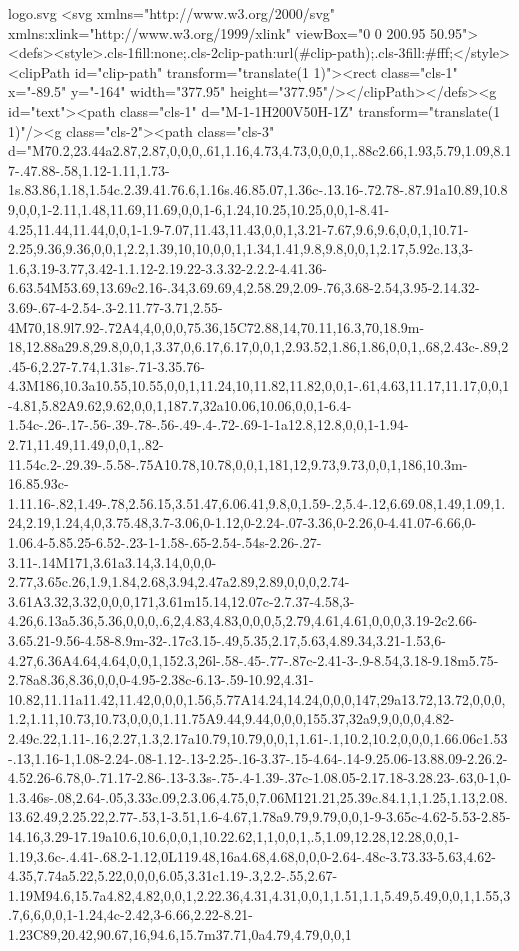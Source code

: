 	\begin{filecontents*}[overwrite]{logo.svg}
	<svg xmlns="http://www.w3.org/2000/svg" xmlns:xlink="http://www.w3.org/1999/xlink" viewBox="0 0 200.95 50.95"><defs><style>.cls-1{fill:none;}.cls-2{clip-path:url(#clip-path);}.cls-3{fill:#fff;}</style><clipPath id="clip-path" transform="translate(1 1)"><rect class="cls-1" x="-89.5" y="-164" width="377.95" height="377.95"/></clipPath></defs><g id="text"><path class="cls-1" d="M-1-1H200V50H-1Z" transform="translate(1 1)"/><g class="cls-2"><path class="cls-3" d="M70.2,23.44a2.87,2.87,0,0,0,.61,1.16,4.73,4.73,0,0,0,1,.88c2.66,1.93,5.79,1.09,8.17-.47.88-.58,1.12-1.11,1.73-1s.83.86,1.18,1.54c.2.39.41.76.6,1.16s.46.85.07,1.36c-.13.16-.72.78-.87.91a10.89,10.89,0,0,1-2.11,1.48,11.69,11.69,0,0,1-6,1.24,10.25,10.25,0,0,1-8.41-4.25,11.44,11.44,0,0,1-1.9-7.07,11.43,11.43,0,0,1,3.21-7.67,9.6,9.6,0,0,1,10.71-2.25,9.36,9.36,0,0,1,2.2,1.39,10,10,0,0,1,1.34,1.41,9.8,9.8,0,0,1,2.17,5.92c.13,3-1.6,3.19-3.77,3.42-1.1.12-2.19.22-3.3.32-2.2.2-4.41.36-6.63.54M53.69,13.69c2.16-.34,3.69.69,4,2.58.29,2.09-.76,3.68-2.54,3.95-2.14.32-3.69-.67-4-2.54-.3-2.11.77-3.71,2.55-4M70,18.9l7.92-.72A4,4,0,0,0,75.36,15C72.88,14,70.11,16.3,70,18.9m-18,12.88a29.8,29.8,0,0,1,3.37,0,6.17,6.17,0,0,1,2.93.52,1.86,1.86,0,0,1,.68,2.43c-.89,2.45-6,2.27-7.74,1.31s-.71-3.35.76-4.3M186,10.3a10.55,10.55,0,0,1,11.24,10,11.82,11.82,0,0,1-.61,4.63,11.17,11.17,0,0,1-4.81,5.82A9.62,9.62,0,0,1,187.7,32a10.06,10.06,0,0,1-6.4-1.54c-.26-.17-.56-.39-.78-.56-.49-.4-.72-.69-1-1a12.8,12.8,0,0,1-1.94-2.71,11.49,11.49,0,0,1,.82-11.54c.2-.29.39-.5.58-.75A10.78,10.78,0,0,1,181,12,9.73,9.73,0,0,1,186,10.3m-16.85.93c-1.11.16-.82,1.49-.78,2.56.15,3.51.47,6.06.41,9.8,0,1.59-.2,5.4-.12,6.69.08,1.49,1.09,1.24,2.19,1.24,4,0,3.75.48,3.7-3.06,0-1.12,0-2.24-.07-3.36,0-2.26,0-4.41.07-6.66,0-1.06.4-5.85.25-6.52-.23-1-1.58-.65-2.54-.54s-2.26-.27-3.11-.14M171,3.61a3.14,3.14,0,0,0-2.77,3.65c.26,1.9,1.84,2.68,3.94,2.47a2.89,2.89,0,0,0,2.74-3.61A3.32,3.32,0,0,0,171,3.61m15.14,12.07c-2.7.37-4.58,3-4.26,6.13a5.36,5.36,0,0,0,.6,2,4.83,4.83,0,0,0,5,2.79,4.61,4.61,0,0,0,3.19-2c2.66-3.65.21-9.56-4.58-8.9m-32-.17c3.15-.49,5.35,2.17,5.63,4.89.34,3.21-1.53,6-4.27,6.36A4.64,4.64,0,0,1,152.3,26l-.58-.45-.77-.87c-2.41-3-.9-8.54,3.18-9.18m5.75-2.78a8.36,8.36,0,0,0-4.95-2.38c-6.13-.59-10.92,4.31-10.82,11.11a11.42,11.42,0,0,0,1.56,5.77A14.24,14.24,0,0,0,147,29a13.72,13.72,0,0,0,1.2,1.11,10.73,10.73,0,0,0,1.11.75A9.44,9.44,0,0,0,155.37,32a9,9,0,0,0,4.82-2.49c.22,1.11-.16,2.27,1.3,2.17a10.79,10.79,0,0,1,1.61-.1,10.2,10.2,0,0,0,1.66.06c1.53-.13,1.16-1,1.08-2.24-.08-1.12-.13-2.25-.16-3.37-.15-4.64-.14-9.25.06-13.88.09-2.26.2-4.52.26-6.78,0-.71.17-2.86-.13-3.3s-.75-.4-1.39-.37c-1.08.05-2.17.18-3.28.23-.63,0-1,0-1.3.46s-.08,2.64-.05,3.33c.09,2.3.06,4.75,0,7.06M121.21,25.39c.84.1,1,1.25,1.13,2.08.13.62.49,2.25.22,2.77-.53,1-3.51,1.6-4.67,1.78a9.79,9.79,0,0,1-9-3.65c-4.62-5.53-2.85-14.16,3.29-17.19a10.6,10.6,0,0,1,10.22.62,1,1,0,0,1,.5,1.09,12.28,12.28,0,0,1-1.19,3.6c-.4.41-.68.2-1.12,0L119.48,16a4.68,4.68,0,0,0-2.64-.48c-3.73.33-5.63,4.62-4.35,7.74a5.22,5.22,0,0,0,6.05,3.31c1.19-.3,2.2-.55,2.67-1.19M94.6,15.7a4.82,4.82,0,0,1,2.22.36,4.31,4.31,0,0,1,1.51,1.1,5.49,5.49,0,0,1,1.55,3.7,6,6,0,0,1-1.24,4c-2.42,3-6.66,2.22-8.21-1.23C89,20.42,90.67,16,94.6,15.7m37.71,0a4.79,4.79,0,0,1
\end{filecontents*}
